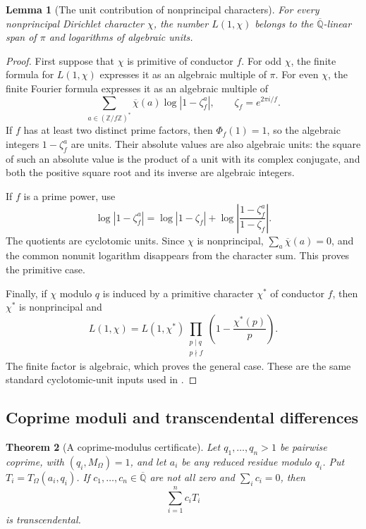 \documentclass[11pt,a4paper]{article}
\newtheorem{theorem}{Theorem}[section]
\newtheorem{lemma}[theorem]{Lemma}
\theoremstyle{definition}
\theoremstyle{remark}
\numberwithin{equation}{section}
\begin{document}
\begin{lemma}[The unit contribution of nonprincipal characters]
\label{p1:nt-l-values-units}
For every nonprincipal Dirichlet character $\chi$, the number
$L(1,\chi)$ belongs to the $\overline{\mathbb Q}$-linear span of
$\pi$ and logarithms of algebraic units.
\end{lemma}

\begin{proof}
First suppose that $\chi$ is primitive of conductor $f$.  For odd
$\chi$, the finite formula for $L(1,\chi)$ expresses it as an
algebraic multiple of $\pi$.  For even $\chi$, the finite Fourier
formula expresses it as an algebraic multiple of
\[
 \sum_{a\in(\mathbb Z/f\mathbb Z)^*}
 \overline\chi(a)\log|1-\zeta_f^a|,
 \qquad \zeta_f=e^{2\pi i/f}.
\]
If $f$ has at least two distinct prime factors, then
$\Phi_f(1)=1$, so the algebraic integers $1-\zeta_f^a$ are units.
Their absolute values are also algebraic units: the square of such an
absolute value is the product of a unit with its complex conjugate,
and both the positive square root and its inverse are algebraic
integers.

If $f$ is a prime power, use
\[
 \log|1-\zeta_f^a|=
 \log|1-\zeta_f|+
 \log\left|\frac{1-\zeta_f^a}{1-\zeta_f}\right|.
\]
The quotients are cyclotomic units.  Since $\chi$ is nonprincipal,
$\sum_a\overline\chi(a)=0$, and the common nonunit logarithm
disappears from the character sum.  This proves the primitive case.

Finally, if $\chi$ modulo $q$ is induced by a primitive character
$\chi^*$ of conductor $f$, then $\chi^*$ is nonprincipal and
\[
 L(1,\chi)=L(1,\chi^*)
 \prod_{\substack{p\mid q\\p\nmid f}}
 \left(1-\frac{\chi^*(p)}p\right).
\]
The finite factor is algebraic, which proves the general case.
These are the same standard cyclotomic-unit inputs used in
\cite[Section~3]{p1:GMS2016}.
\end{proof}

\subsection{Coprime moduli and transcendental differences}
\label{p1:nt-coprime-section}

\begin{theorem}[A coprime-modulus certificate]
\label{p1:nt-coprime-certificate}
Let $q_1,\ldots,q_n>1$ be pairwise coprime, with
$(q_i,M_\Omega)=1$, and let $a_i$ be any reduced residue modulo
$q_i$.  Put $T_i=T_\Omega(a_i,q_i)$.  If
$c_1,\ldots,c_n\in\overline{\mathbb Q}$ are not all zero and
$\sum_i c_i=0$, then
\[
 \sum_{i=1}^n c_iT_i
\]
is transcendental.
\end{theorem}
\end{document}
